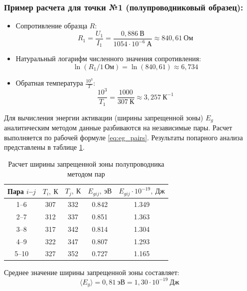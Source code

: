\documentclass[12pt]{article}
\begin{document}
\subsubsection*{Пример расчета для точки №1 (полупроводниковый образец):}
\begin{itemize}
    \item Сопротивление образца $R$:
    \begin{equation}
        R_1 = \frac{U_1}{I_1} = \frac{0{,}886~\text{В}}{1054 \cdot 10^{-6}~\text{А}} \approx 840{,}61~\text{Ом}
    \end{equation}
    \item Натуральный логарифм численного значения сопротивления:
    \begin{equation}
        \ln (R_1 / 1\,\text{Ом}) = \ln(840{,}61) \approx 6{,}734
    \end{equation}
    \item Обратная температура $\frac{10^3}{T}$:
    \begin{equation}
        \frac{10^3}{T_1} = \frac{1000}{307~\text{К}} \approx 3{,}257~\text{К}^{-1}
    \end{equation}
\end{itemize}

Для вычисления энергии активации (ширины запрещенной зоны) $E_g$ аналитическим методом данные разбиваются на независимые пары. Расчет выполняется по рабочей формуле \eqref{eq:eg_pairs}. Результаты попарного анализа представлены в таблице \ref{tab:semi_pairs}.

\begin{table}[H]
\centering
\caption{Расчет ширины запрещенной зоны полупроводника методом пар}
\label{tab:semi_pairs}
\vspace{0.2cm}
\small
\begin{tabular}{ccccc}
\toprule
Пара $i$--$j$ & $T_i, ~\text{К}$ & $T_j, ~\text{К}$ & $E_{gij}, ~\text{эВ}$ & $E_{gij} \cdot 10^{-19}, ~\text{Дж}$ \\
\midrule
1--6  & 307 & 332 & 0.842 & 1.349 \\
2--7  & 312 & 337 & 0.851 & 1.363 \\
3--8  & 317 & 342 & 0.814 & 1.304 \\
4--9  & 322 & 347 & 0.807 & 1.293 \\
5--10 & 327 & 352 & 0.727 & 1.165 \\
\bottomrule
\end{tabular}
\end{table}

Среднее значение ширины запрещенной зоны составляет:
$$ \langle E_g \rangle = 0{,}81~\text{эВ} = 1{,}30 \cdot 10^{-19}~\text{Дж} $$
\end{document}
